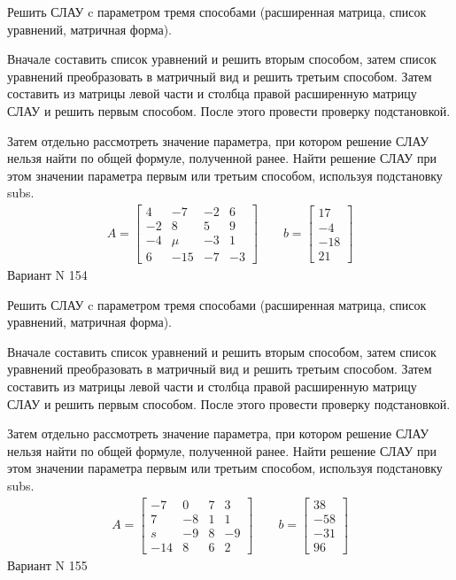 \documentclass[11pt]{report}
\begin{document}
Решить СЛАУ c параметром тремя способами (расширенная матрица, список уравнений, матричная форма).

Вначале составить список уравнений и решить вторым способом,
затем список уравнений преобразовать в матричный вид и решить третьим способом.
Затем составить из матрицы левой части и столбца правой расширенную матрицу СЛАУ и решить первым способом.
После этого провести проверку подстановкой.

Затем отдельно рассмотреть значение параметра, при котором решение СЛАУ нельзя найти по общей формуле,
полученной ранее.
Найти решение СЛАУ при этом значении параметра первым или третьим способом, используя подстановку subs.
\begin{align*}
    A = \left[\begin{matrix}4 & -7 & -2 & 6\\-2 & 8 & 5 & 9\\-4 & \mu & -3 & 1\\6 & -15 & -7 & -3\end{matrix}\right]
\qquad b = \left[\begin{matrix}17\\-4\\-18\\21\end{matrix}\right]
\end{align*}
\newpage
Вариант N 154


Решить СЛАУ c параметром тремя способами (расширенная матрица, список уравнений, матричная форма).

Вначале составить список уравнений и решить вторым способом,
затем список уравнений преобразовать в матричный вид и решить третьим способом.
Затем составить из матрицы левой части и столбца правой расширенную матрицу СЛАУ и решить первым способом.
После этого провести проверку подстановкой.

Затем отдельно рассмотреть значение параметра, при котором решение СЛАУ нельзя найти по общей формуле,
полученной ранее.
Найти решение СЛАУ при этом значении параметра первым или третьим способом, используя подстановку subs.
\begin{align*}
    A = \left[\begin{matrix}-7 & 0 & 7 & 3\\7 & -8 & 1 & 1\\s & -9 & 8 & -9\\-14 & 8 & 6 & 2\end{matrix}\right]
\qquad b = \left[\begin{matrix}38\\-58\\-31\\96\end{matrix}\right]
\end{align*}
\newpage
Вариант N 155
\end{document}
